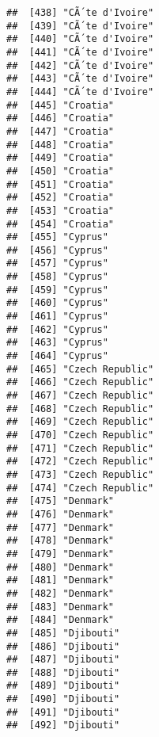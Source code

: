 \documentclass[]{article}
\begin{document}
\begin{verbatim}
##  [438] "CÃ´te d'Ivoire"                      
##  [439] "CÃ´te d'Ivoire"                      
##  [440] "CÃ´te d'Ivoire"                      
##  [441] "CÃ´te d'Ivoire"                      
##  [442] "CÃ´te d'Ivoire"                      
##  [443] "CÃ´te d'Ivoire"                      
##  [444] "CÃ´te d'Ivoire"                      
##  [445] "Croatia"                            
##  [446] "Croatia"                            
##  [447] "Croatia"                            
##  [448] "Croatia"                            
##  [449] "Croatia"                            
##  [450] "Croatia"                            
##  [451] "Croatia"                            
##  [452] "Croatia"                            
##  [453] "Croatia"                            
##  [454] "Croatia"                            
##  [455] "Cyprus"                             
##  [456] "Cyprus"                             
##  [457] "Cyprus"                             
##  [458] "Cyprus"                             
##  [459] "Cyprus"                             
##  [460] "Cyprus"                             
##  [461] "Cyprus"                             
##  [462] "Cyprus"                             
##  [463] "Cyprus"                             
##  [464] "Cyprus"                             
##  [465] "Czech Republic"                     
##  [466] "Czech Republic"                     
##  [467] "Czech Republic"                     
##  [468] "Czech Republic"                     
##  [469] "Czech Republic"                     
##  [470] "Czech Republic"                     
##  [471] "Czech Republic"                     
##  [472] "Czech Republic"                     
##  [473] "Czech Republic"                     
##  [474] "Czech Republic"                     
##  [475] "Denmark"                            
##  [476] "Denmark"                            
##  [477] "Denmark"                            
##  [478] "Denmark"                            
##  [479] "Denmark"                            
##  [480] "Denmark"                            
##  [481] "Denmark"                            
##  [482] "Denmark"                            
##  [483] "Denmark"                            
##  [484] "Denmark"                            
##  [485] "Djibouti"                           
##  [486] "Djibouti"                           
##  [487] "Djibouti"                           
##  [488] "Djibouti"                           
##  [489] "Djibouti"                           
##  [490] "Djibouti"                           
##  [491] "Djibouti"                           
##  [492] "Djibouti"                           

\end{verbatim}
\end{document}
